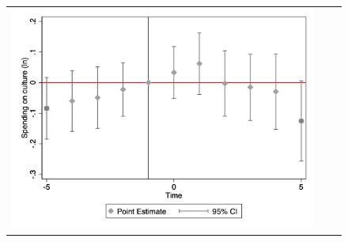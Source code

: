 \begin{figure}[!ht]
\begin{tabular}{@{}ccc@{}}
\begin{minipage}[t]{0.32\textwidth}
            \includegraphics[width=\linewidth]{images/total population/eventdd_ln_q4_05_step1.jpg}
            \label{fig:culture}
        \end{minipage} \\[10pt]


\end{tabular}
\end{figure}

